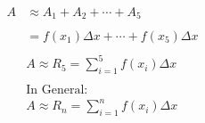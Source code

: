 \documentclass{beamer}
\begin{document}
\begin{frame} [plain]
\begin{columns}[t]
 	
	  	\begin{align*}
		A & \approx A_1+A_2+\cdots+A_5\\
		\\
		&=f(x_1)\Delta{x}+\cdots+ f(x_5)\Delta{x} \\
		\\
		&A \approx R_5=\sum_{i=1}^{5}f(x_i)\Delta{x} \\
		\\
		&\text{In General:}\\
		&A \approx R_n=\sum_{i=1}^{n}f(x_i)\Delta{x}\\
		\end{align*}
	
 	\end{columns}

\end{frame}



\end{document}
